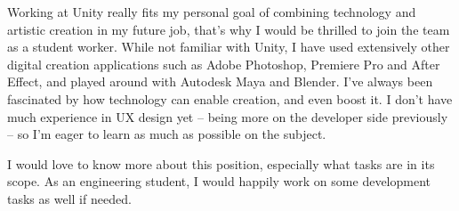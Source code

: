 \documentclass[12pt, a4paper]{awesome-cv}
\begin{document}
\begin{cvletter}
Working at Unity really fits my personal goal of combining technology and artistic creation in my future job, that’s why I would be thrilled to join the team as a student worker. While not familiar with Unity, I have used extensively other digital creation applications such as Adobe Photoshop, Premiere Pro and After Effect, and played around with Autodesk Maya and Blender. I’ve always been fascinated by how technology can enable creation, and even boost it. I don’t have much experience in UX design yet – being more on the developer side previously – so I'm eager to learn as much as possible on the subject.

I would love to know more about this position, especially what tasks are in its scope. As an engineering student, I would happily work on some development tasks as well if needed.





\end{cvletter}


\makeletterclosing
\end{document}
